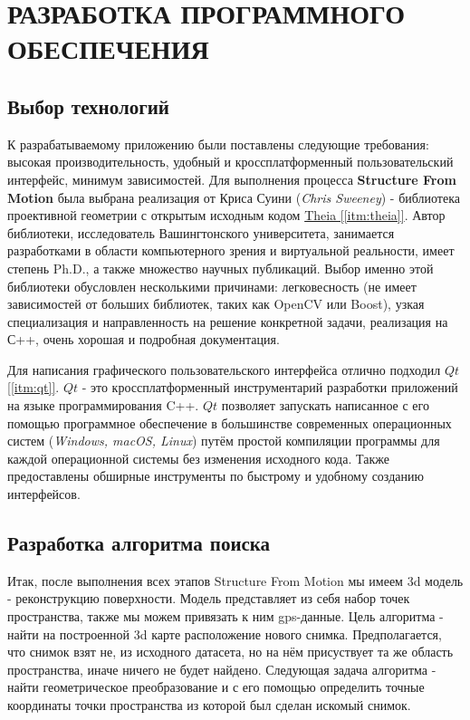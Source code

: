 \chapter{РАЗРАБОТКА ПРОГРАММНОГО ОБЕСПЕЧЕНИЯ}

\section{Выбор технологий}

К разрабатываемому приложению были поставлены следующие требования: высокая производительность, удобный и кроссплатформенный пользовательский интерфейс, минимум зависимостей. Для выполнения процесса \textbf{Structure From Motion} была выбрана реализация от Криса Суини (\textit{Chris Sweeney}) - библиотека проективной геометрии с открытым исходным кодом \hyperref[itm:theia]{Theia [\ref{itm:theia}]}. Автор библиотеки, исследователь Вашингтонского университета, занимается разработками в области компьютерного зрения и виртуальной реальности, имеет степень Ph.D., а также множество научных публикаций. Выбор именно этой библиотеки обусловлен несколькими причинами: легковесность (не имеет зависимостей от больших библиотек, таких как OpenCV или Boost), узкая специализация и направленность на решение конкретной задачи, реализация на С++, очень хорошая и подробная документация. 

Для написания графического пользовательского интерфейса отлично подходил \hyperref[itm:qt]{$Qt$ [\ref{itm:qt}]}. $Qt$ - это кроссплатформенный инструментарий разработки приложений на языке программирования C++. $Qt$ позволяет запускать написанное с его помощью программное обеспечение в большинстве современных операционных систем (\textit{Windows, macOS, Linux}) путём простой компиляции программы для каждой операционной системы без изменения исходного кода. Также предоставлены обширные инструменты по быстрому и удобному созданию интерфейсов.

\section{Разработка алгоритма поиска}
Итак, после выполнения всех этапов Structure From Motion мы имеем 3d модель - реконструкцию поверхности. Модель представляет из себя набор точек пространства, также мы можем привязать к ним gps-данные. Цель алгоритма - найти на построенной 3d карте расположение нового снимка. Предполагается, что снимок взят не, из исходного датасета, но на нём присуствует та же область пространства, иначе ничего не будет найдено. Следующая задача алгоритма - найти геометрическое преобразование и с его помощью определить точные координаты точки пространства из которой был сделан искомый снимок.


